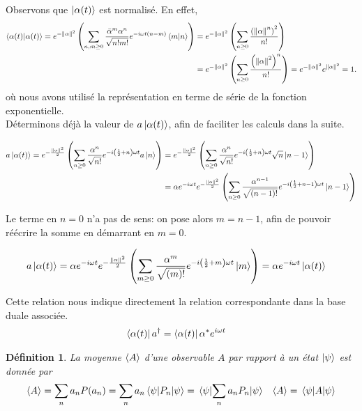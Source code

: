 \documentclass[11pt,oneside,a4paper]{article}
\newtheorem{definition}[theorem]{Définition}
\begin{document}
Observons que $\ket{\alpha(t)}$ est normalisé. En effet,
\begin{align}
  \braket{\alpha(t)} = e^{-\norm{\alpha}^2}\left(\sum_{n,m\geq 0}\frac{\bar{\alpha}^m\alpha^n}{\sqrt{n!m!}}e^{-i\omega t\left(n-m\right)}\braket{m}{n}\right)
  &= e^{-\norm{\alpha}^2}\left(\sum_{n\geq 0}\frac{\left(\norm{\alpha}^n\right)^2}{n!}\right)\\
  &= e^{-\norm{\alpha}^2}\left(\sum_{n\geq 0}\frac{\left(\norm{\alpha}^2\right)^n}{n!}\right) = e^{-\norm{\alpha}^2}e^{\norm{\alpha}^2} = 1.
\end{align}
où nous avons utilisé la représentation en terme de série de la fonction exponentielle.\\

Déterminons déjà la valeur de $a\ket{\alpha(t)}$, afin de faciliter les calculs dans la suite. 

\begin{align}
  a\ket{\alpha(t)} = e^{-\frac{\norm{\alpha}^2}{2}}\left(\sum_{n\geq 0}\frac{\alpha^n}{\sqrt{n!}}e^{-i\left(\frac{1}{2}+n\right)\omega t}a\ket{n}\right)
  &= e^{-\frac{\norm{\alpha}^2}{2}}\left(\sum_{n\geq 0}\frac{\alpha^n}{\sqrt{n!}}e^{-i\left(\frac{1}{2}+n    \right)\omega t}\sqrt{n}\ket{n-1}\right)\\
  &= \alpha e^{-i\omega t}e^{-\frac{\norm{\alpha}^2}{2}}\left(\sum_{n\geq 0}\frac{\alpha^{n-1}}{\sqrt{(n-1)!}}e^{-i\left(\frac{1}{2}+n-1    \right)\omega t}\ket{n-1}\right)
\end{align}

Le terme en $n = 0$ n'a pas de sens: on pose alors $m=n-1$, afin de pouvoir réécrire la somme en démarrant en $m = 0$.

\begin{align}
  a\ket{\alpha(t)} &= \alpha e^{-i\omega t}e^{-\frac{\norm{\alpha}^2}{2}}\left(\sum_{m\geq 0}\frac{\alpha^{m}}{\sqrt{(m)!}}e^{-i\left(\frac{1}{2}+m    \right)\omega t}\ket{m}\right) = \alpha e^{-i\omega t}\ket{\alpha(t)}
\end{align}

Cette relation nous indique directement la relation correspondante dans la base duale associée. 
\begin{align}
  \bra{\alpha(t)}a^\dagger &= \bra{\alpha(t)}\alpha^*e^{i\omega t}
\end{align}

\begin{definition}
  La moyenne $\expval{A}$ d'une observable $A$ par rapport à un état $\ket{\psi}$ est donnée par
  \begin{align}
    \expval{A} &= \sum_n a_nP(a_n) = \sum_n a_n \expval{P_n}{\psi} = \expval{\sum_n a_nP_n}{\psi} &\expval{A} = \expval{A}{\psi} 
  \end{align}
\end{definition}
\end{document}
